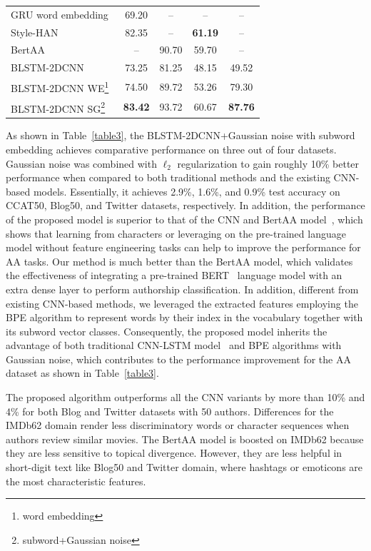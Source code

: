 \documentclass[conference]{IEEEtran}
\begin{document}
\begin{table}[!t]
\begin{tabular}{p{4cm}cccc}
GRU word embedding~\cite{gupta2017study}  & 69.20 & -- & -- & --\\
Style-HAN~\cite{jafariakinabad2019style} & 82.35 & -- & \textbf{61.19} & --\\
BertAA~\cite{fabien2020bertaa} & -- & 90.70 & 59.70 & --\\
\hline
BLSTM-2DCNN & 73.25 & 81.25 & 48.15 & 49.52\\
BLSTM-2DCNN WE\footnote{word embedding} & 74.50 & 89.72 & 53.26 & 79.30\\
BLSTM-2DCNN SG\footnote{subword+Gaussian noise} & \textbf{83.42} & 93.72 & 60.67 & \textbf{87.76}\\
\hline
\end{tabular}
\end{table}
As shown in Table~\ref{table3}, the BLSTM-2DCNN+Gaussian noise with subword embedding achieves comparative performance on three out of four datasets. Gaussian noise was combined with $\ell_{2}$ regularization to gain roughly 10\% better performance when compared to both traditional methods and the existing CNN-based models. Essentially, it achieves 2.9\%, 1.6\%, and 0.9\% test accuracy on CCAT50, Blog50, and Twitter datasets, respectively. In addition, the performance of the proposed model is superior to that of the CNN and BertAA model~\cite{ruder2016character,fabien2020bertaa}, which shows that learning from characters or leveraging on the pre-trained language model without feature engineering tasks can help to improve the performance for AA tasks. Our method is much better than the BertAA model, which validates the effectiveness of integrating a pre-trained BERT~\cite{devlin2018bert} language model with an extra dense layer to perform authorship classification. In addition, different from existing CNN-based methods, we leveraged the extracted features employing the BPE algorithm to represent words by their index in the vocabulary together with its subword vector classes. Consequently, the proposed model inherits the advantage of both traditional CNN-LSTM model~\cite{ruder2016character,gupta2017study,jafariakinabad2019syntactic} and BPE algorithms with Gaussian noise, which contributes to the performance improvement for the AA dataset as shown in Table~\ref{table3}.

The proposed algorithm outperforms all the CNN variants by more than 10\% and 4\% for both Blog and Twitter datasets with 50 authors. Differences for the IMDb62 domain render less discriminatory words or character sequences when authors review similar movies. The BertAA model is boosted on IMDb62 because they are less sensitive to topical divergence. However, they are less helpful in short-digit text like Blog50 and Twitter domain, where hashtags or emoticons are the most characteristic features.
\end{document}
